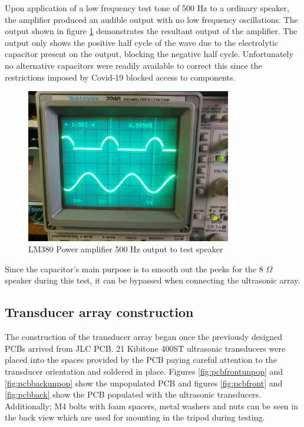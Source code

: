 Upon application of a low frequency test tone of 500 Hz to a ordinary speaker, the amplifier produced an audible output with no low frequency oscillations. The output shown in figure \ref{fig:ampOscOut} demonstrates the resultant output of the amplifier. The output only shows the positive half cycle of the wave due to the electrolytic capacitor present on the output, blocking the negative half cycle. Unfortunately no alternative capacitors were readily available to correct this since the restrictions imposed by Covid-19 blocked access to components.
\begin{figure}[ht!]
    \centering
    \includegraphics[width=0.8\textwidth]{Figures/Implementation/Amplifier/ampOutbb.jpg}
    \caption{LM380 Power amplifier 500 Hz output to test speaker}
    \label{fig:ampOscOut}
\end{figure}
Since the capacitor's main purpose is to smooth out the peeks for the 8 $\Omega$ speaker during this test, it can be bypassed when connecting the ultrasonic array.


\newpage
\subsection{Transducer array construction}
The construction of the transducer array began once the previously designed PCBs arrived from JLC PCB. 21 Kibitone 400ST ultrasonic transducers were placed into the spaces provided by the PCB paying careful attention to the transducer orientation and soldered in place. Figures \ref{fig:pcbfrontunpop} and \ref{fig:pcbbackunpop} show the unpopulated PCB and figures \ref{fig:pcbfront} and \ref{fig:pcbback} show the PCB populated with the ultrasonic transducers. Additionally; M4 bolts with foam spacers, metal washers and nuts can be seen in the back view which are used for mounting in the tripod during testing.

